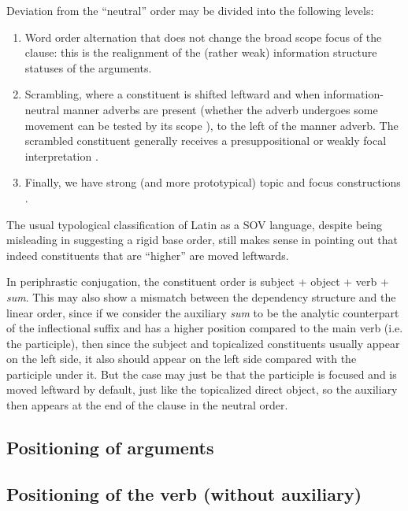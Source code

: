\documentclass[a4paper, oneside, 12pt]{report}
\newcommand*{\citechap}[1]{chap.~{#1}}
\newcommand*{\citepage}[1]{p.~{#1}}
\newcommand*{\citepages}[1]{pp.~{#1}}
\newcommand{\form}[1]{\emph{#1}}
\begin{document}
Deviation from the ``neutral'' order may be divided into the following levels:
\begin{enumerate}
    \item Word order alternation that does not change the broad scope focus of the clause: 
        this is the realignment of the (rather weak) information structure statuses of the arguments.
    \item Scrambling, where a constituent is shifted leftward 
        and when information-neutral manner adverbs are present
        (whether the adverb undergoes some movement can be tested by its scope \citep[\citepage{100}]{devine2006latin}), 
        to the left of the manner adverb.
        The scrambled constituent generally receives a presuppositional or weakly focal interpretation
        \citep[\citepages{102,108-109}]{devine2006latin}.
    \item Finally, we have strong (and more prototypical) topic and focus constructions \citep[\citechap{3}]{devine2006latin}.
\end{enumerate}
The usual typological classification of Latin as a SOV language, 
despite being misleading in suggesting a rigid base order, 
still makes sense in pointing out that indeed constituents that are ``higher'' are moved leftwards.

In periphrastic conjugation,
the constituent order is subject + object + verb + \form{sum}.
This may also show a mismatch between the dependency structure and the linear order,
since if we consider the auxiliary \form{sum} to be 
the analytic counterpart of the inflectional suffix 
and has a higher position compared to the main verb (i.e. the participle),
then since the subject and topicalized constituents usually appear on the left side, 
it also should appear on the left side compared with the participle under it.
But the case may just be that the participle is focused and is moved leftward by default, 
just like the topicalized direct object,
so the auxiliary then appears at the end of the clause in the neutral order.

\subsection{Positioning of arguments}

\subsection{Positioning of the verb (without auxiliary)}
\end{document}
